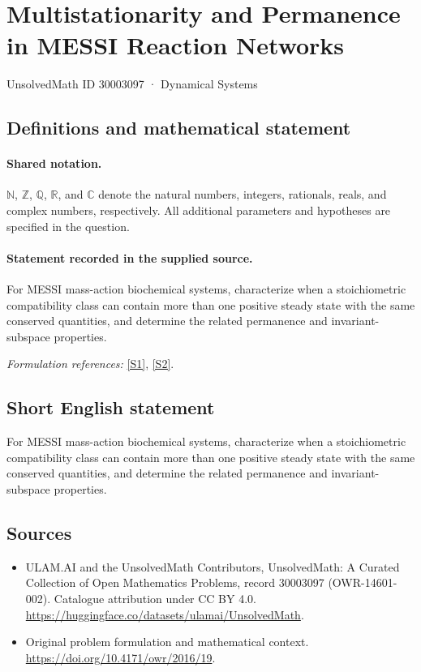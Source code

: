\documentclass[11pt]{article}
\newcommand{\sref}[2]{\hyperlink{source:#1:#2}{[S#2]}}
\begin{document}
\setcounter{section}{30003096}
\section{Multistationarity and Permanence in MESSI Reaction Networks}\label{30003097}
{\small UnsolvedMath ID 30003097 · Dynamical Systems}
\subsection{Definitions and mathematical statement}

\paragraph{Shared notation.}$\mathbb N$, $\mathbb Z$, $\mathbb Q$, $\mathbb R$, and $\mathbb C$ denote the natural numbers, integers, rationals, reals, and complex numbers, respectively. All additional parameters and hypotheses are specified in the question.


\paragraph{Statement recorded in the supplied source.}
For MESSI mass-action biochemical systems, characterize when a stoichiometric compatibility class can contain more than one positive steady state with the same conserved quantities, and determine the related permanence and invariant-subspace properties.
\par\smallskip\textit{Formulation references:} \sref{30003097}{1}, \sref{30003097}{2}.
\subsection{Short English statement}
For MESSI mass-action biochemical systems, characterize when a stoichiometric compatibility class can contain more than one positive steady state with the same conserved quantities, and determine the related permanence and invariant-subspace properties.
\subsection{Sources}
\begin{itemize}
\item[\hypertarget{source:30003097:1}{S1}] ULAM.AI and the UnsolvedMath Contributors, UnsolvedMath: A Curated Collection of Open Mathematics Problems, record 30003097 (OWR-14601-002). Catalogue attribution under CC BY 4.0.
\url{https://huggingface.co/datasets/ulamai/UnsolvedMath}.
\item[\hypertarget{source:30003097:2}{S2}] Original problem formulation and mathematical context.
\url{https://doi.org/10.4171/owr/2016/19}.
\end{itemize}
\label{end:30003097}
\end{document}
